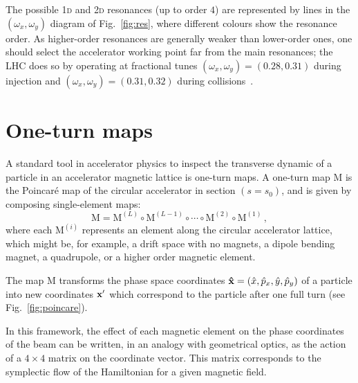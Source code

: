 The possible 1\textsc{d} and 2\textsc{d} resonances (up to order $4$) are represented by lines in the $(\omega_x, \omega_y)$ diagram of Fig.~\ref{fig:res}, where different colours show the resonance order. As higher-order resonances are generally weaker than lower-order ones, one should select the accelerator working point far from the main resonances; the LHC does so by operating at fractional tunes $(\omega_x, \omega_y)=(0.28, 0.31)$ during injection and $(\omega_x, \omega_y)=(0.31, 0.32)$ during collisions~\cite{Benedikt:823808}.

\section{One-turn maps} \label{sec:acc:oneturn}

A standard tool in accelerator physics to inspect the transverse dynamic of a particle in an accelerator magnetic lattice is one-turn maps. A one-turn map \(\mathrm{M}\) is the Poincaré map of the circular accelerator in section $(s = s_0)$, and is given by composing single-element maps:
\begin{equation}
	\mathrm{M} = \mathrm{M}^{(L)} \circ \mathrm{M}^{(L - 1)} \circ \cdots \circ \mathrm{M}^{(2)} \circ \mathrm{M}^{(1)} \,,
\end{equation}
where each $\mathrm{M}^{(i)}$ represents an element along the circular accelerator lattice, which might be, for example, a drift space with no magnets, a dipole bending magnet, a quadrupole, or a higher order magnetic element. 

The map \(\mathrm{M}\) transforms the phase space coordinates \(\vb{\hat x} = (\hat x, \hat p_x, \hat y, \hat p_y)\) of a particle into new coordinates \(\vb{x}'\) which correspond to the particle after one full turn (see Fig.~\ref{fig:poincare}).

In this framework, the effect of each magnetic element on the phase coordinates of the beam can be written, in an analogy with geometrical optics, as the action of a $4\times4$ matrix on the coordinate vector. This matrix corresponds to the symplectic flow of the Hamiltonian for a given magnetic field.

